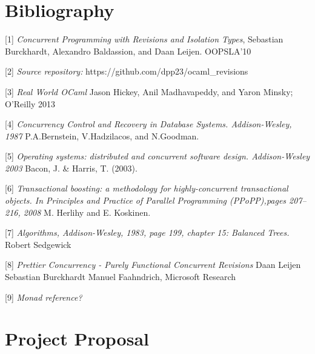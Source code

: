 \documentclass[12pt,twoside,notitlepage]{report}
\begin{document}

\cleardoublepage
\chapter{Bibliography}
\begin{description}
\item{[1]} \emph{Concurrent Programming with Revisions and Isolation Types}, Sebastian Burckhardt, Alexandro Baldassion, and Daan Leijen. OOPSLA'10
\item{[2]} \emph{Source repository:} https://github.com/dpp23/ocaml\_revisions
\item{[3]} \emph{Real World OCaml} Jason Hickey, Anil Madhavapeddy, and Yaron Minsky; O'Reilly 2013
\item{[4]} \emph{Concurrency Control and Recovery in Database Systems. Addison-Wesley, 1987} P.A.Bernstein, V.Hadzilacos, and N.Goodman.


\item{[5]} \emph{Operating systems: distributed and concurrent software design. Addison-Wesley 2003} Bacon, J. \& Harris, T. (2003). 
\item{[6]} \emph{Transactional boosting: a
methodology for highly-concurrent transactional objects. In
Principles and Practice of Parallel Programming (PPoPP),pages 207–216, 2008} M. Herlihy and E. Koskinen. 

\item{[7]} \emph{Algorithms, Addison-Wesley, 1983, page 199, chapter 15: Balanced Trees.} Robert Sedgewick

\item{[8]} \emph{Prettier Concurrency - Purely Functional Concurrent Revisions} Daan Leijen Sebastian Burckhardt Manuel Faahndrich, Microsoft Research

\item{[9]} \emph{Monad reference?}
\end{description}

\appendix


\chapter{Project Proposal}

%
\end{document}
